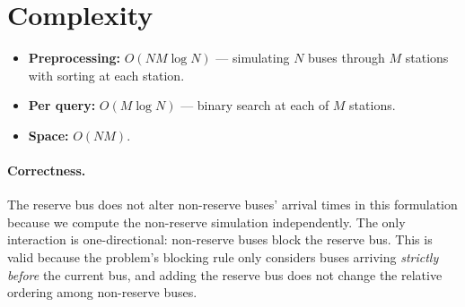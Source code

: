 \documentclass[11pt,a4paper]{article}
\begin{document}
\section{Complexity}

\begin{itemize}
  \item \textbf{Preprocessing:} $O(NM \log N)$ --- simulating $N$ buses
        through $M$ stations with sorting at each station.
  \item \textbf{Per query:} $O(M \log N)$ --- binary search at each of
        $M$ stations.
  \item \textbf{Space:} $O(NM)$.
\end{itemize}

\paragraph{Correctness.}  The reserve bus does not alter non-reserve
buses' arrival times in this formulation because we compute the
non-reserve simulation independently.  The only interaction is
one-directional: non-reserve buses block the reserve bus.  This is valid
because the problem's blocking rule only considers buses arriving
\emph{strictly before} the current bus, and adding the reserve bus does
not change the relative ordering among non-reserve buses.
\end{document}
